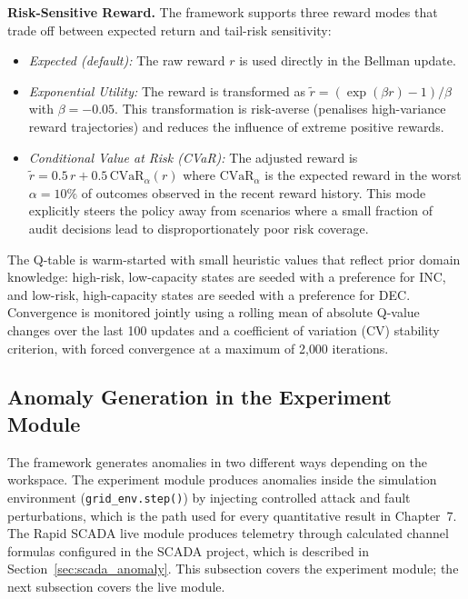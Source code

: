 \par \vspace{0.35cm}
\noindent
\textbf{Risk-Sensitive Reward.} The framework supports three reward modes that trade off between expected return and tail-risk sensitivity:

\begin{itemize}
    \item \textit{Expected (default):} The raw reward $r$ is used directly in the Bellman update.
    \item \textit{Exponential Utility:} The reward is transformed as $\tilde{r} = (\exp(\beta r) - 1) / \beta$ with $\beta = -0.05$. This transformation is risk-averse (penalises high-variance reward trajectories) and reduces the influence of extreme positive rewards.
    \item \textit{Conditional Value at Risk (CVaR):} The adjusted reward is $\tilde{r} = 0.5\, r + 0.5\, \text{CVaR}_{\alpha}(r)$ where $\text{CVaR}_{\alpha}$ is the expected reward in the worst $\alpha = 10\%$ of outcomes observed in the recent reward history. This mode explicitly steers the policy away from scenarios where a small fraction of audit decisions lead to disproportionately poor risk coverage.
\end{itemize}

The Q-table is warm-started with small heuristic values that reflect prior domain knowledge: high-risk, low-capacity states are seeded with a preference for \textsc{INC}, and low-risk, high-capacity states are seeded with a preference for \textsc{DEC}. Convergence is monitored jointly using a rolling mean of absolute Q-value changes over the last 100 updates and a coefficient of variation (CV) stability criterion, with forced convergence at a maximum of 2{,}000 iterations.

\subsection{Anomaly Generation in the Experiment Module}
\label{sec:attack_injection}

The framework generates anomalies in two different ways depending on the workspace. The experiment module produces anomalies inside the simulation environment (\texttt{grid\_env.step()}) by injecting controlled attack and fault perturbations, which is the path used for every quantitative result in Chapter~7. The Rapid SCADA live module produces telemetry through calculated channel formulas configured in the SCADA project, which is described in Section~\ref{sec:scada_anomaly}. This subsection covers the experiment module; the next subsection covers the live module.

